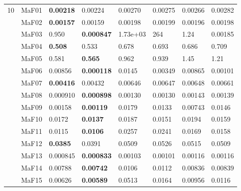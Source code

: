 \documentclass[]{article}
\begin{document}
\begin{landscape}
\begin{table}
\begin{footnotesize}
\begin{tabular}{|l|l|l|l|l|l|l|l|}
\multirow{15}{*}{10} & MaF01 & \cellcolor{gray95} {\bf 0.00218} & \cellcolor{gray95} 0.00224 & 0.00270 & 0.00275 & 0.00266 & 0.00282\\
 & MaF02 & \cellcolor{gray95} {\bf 0.00157} & \cellcolor{gray95} 0.00159 & 0.00198 & 0.00199 & 0.00196 & 0.00198\\
 & MaF03 & 0.950 & \cellcolor{gray95} {\bf 0.000847} & 1.73e+03 & 264 & 1.24 & \cellcolor{gray95} 0.00185\\
 & MaF04 & \cellcolor{gray95} {\bf 0.508} & \cellcolor{gray95} 0.533 & 0.678 & 0.693 & 0.686 & 0.709\\
 & MaF05 & \cellcolor{gray95} 0.581 & \cellcolor{gray95} {\bf 0.565} & 0.962 & 0.939 & 1.45 & 1.21\\
 & MaF06 & 0.00856 & \cellcolor{gray95} {\bf 0.000118} & 0.0145 & 0.00349 & 0.00865 & \cellcolor{gray95} 0.00101\\
 & MaF07 & \cellcolor{gray95} {\bf 0.00416} & \cellcolor{gray95} 0.00432 & 0.00646 & 0.00647 & 0.00648 & 0.00661\\
 & MaF08 & \cellcolor{gray95} 0.000910 & \cellcolor{gray95} {\bf 0.000898} & 0.00130 & 0.00130 & 0.00143 & 0.00139\\
 & MaF09 & \cellcolor{gray95} 0.00158 & \cellcolor{gray95} {\bf 0.00119} & 0.0179 & 0.0133 & 0.00743 & 0.0146\\
 & MaF10 & 0.0172 & \cellcolor{gray95} {\bf 0.0137} & 0.0187 & \cellcolor{gray95} 0.0151 & 0.0194 & \cellcolor{gray95} 0.0159\\
 & MaF11 & \cellcolor{gray95} 0.0115 & \cellcolor{gray95} {\bf 0.0106} & 0.0257 & 0.0241 & 0.0169 & 0.0158\\
 & MaF12 & \cellcolor{gray95} {\bf 0.0385} & \cellcolor{gray95} 0.0391 & 0.0509 & 0.0526 & 0.0515 & 0.0509\\
 & MaF13 & \cellcolor{gray95} 0.000845 & \cellcolor{gray95} {\bf 0.000833} & 0.00103 & 0.00101 & 0.00116 & 0.00116\\
 & MaF14 & \cellcolor{gray95} 0.00788 & \cellcolor{gray95} {\bf 0.00742} & 0.0106 & 0.0112 & 0.00836 & 0.00839\\
 & MaF15 & \cellcolor{gray95} 0.00626 & \cellcolor{gray95} {\bf 0.00589} & 0.0513 & 0.0164 & 0.00956 & 0.0116\\
\hline


\end{tabular}
\end{footnotesize}
\end{table}
\end{landscape}
\end{document}
